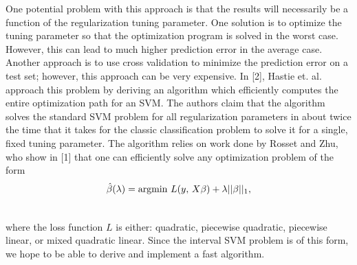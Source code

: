 \documentclass[11pt]{article}
\newcommand{\argmin}[1]{\underset{#1}{\operatorname{argmin}}\text{ }}
\begin{document}
One potential problem with this approach is that the results will
necessarily be a function of the regularization tuning parameter.
One solution is to optimize the tuning parameter so that the optimization
program is solved in the worst case. However, this can lead to much
higher prediction error in the average case. Another approach is to
use cross validation to minimize the prediction error on a test set;
however, this approach can be very expensive.
In {[}2{]}, Hastie et. al. approach this problem by deriving an algorithm
which efficiently computes the entire optimization path for an SVM.
The authors claim that the algorithm solves the standard SVM problem
for all regularization parameters in about twice the time that it
takes for the classic classification problem to solve it for a single,
fixed tuning parameter. The algorithm relies on work done by Rosset
and Zhu, who show in {[}1{]} that one can efficiently solve any optimization
problem of the form
\begin{equation}
\hat{\beta}(\text{\ensuremath{\lambda}})=\argmin\, L(y,\,
X\beta)+\lambda||\beta||_{1},
\end{equation}
\\
where the loss function $L$ is either: quadratic, piecewise quadratic,
piecewise linear, or mixed quadratic linear. Since the interval SVM
problem is of this form, we hope to be able to derive and implement
a fast algorithm.



\end{document}

